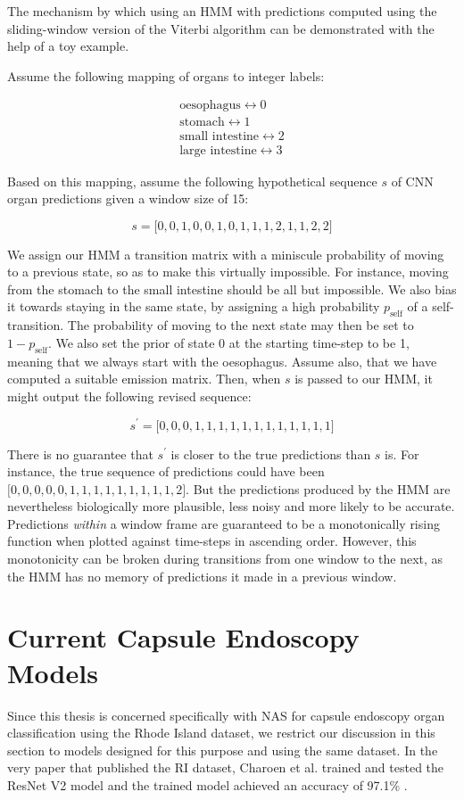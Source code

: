 \documentclass[11pt,a4paper, open=any]{scrbook}
\newcounter{algorithm}[chapter]
\begin{document}
The mechanism by which using an HMM with predictions computed using the sliding-window  version of the Viterbi algorithm can be demonstrated with the help of a toy example.

Assume the following mapping of organs to integer labels:

\begin{align*}
	\text{oesophagus} \leftrightarrow 0\\
	\text{stomach} \leftrightarrow 1\\
	\text{small intestine} \leftrightarrow 2\\
	\text{large intestine} \leftrightarrow 3
\end{align*}

Based on this mapping, assume the following hypothetical sequence $s$ of CNN organ predictions given a window size of 15:


\[
s = \big[0,0,1,0,0,1,0,1,1,1,2,1,1,2,2\big]
\]

We assign our HMM a transition matrix with a miniscule probability of moving to a previous state, so as to make this virtually impossible. For instance, moving from the stomach to the small intestine should be all but impossible. We also bias it towards staying in the same state, by assigning a high probability $p_\text{self}$ of a self-transition. The probability of moving to the next state may then be set to $1-p_\text{self}$. We also set the prior of state 0 at the starting time-step to be 1, meaning that we always start with the oesophagus. Assume also, that we have computed a suitable emission matrix. Then, when $s$ is passed to our HMM, it might output the following revised sequence:

\[
s^\prime = \big[0,0,0,1,1,1,1,1,1,1,1,1,1,1,1\big] 
\]

There is no guarantee that $s^\prime$ is closer to the true predictions than $s$ is. For instance, the true sequence of predictions could have been $\big[0,0,0,0,0,1,1,1,1,1,1,1,1,1,2\big]$. But the predictions produced by the HMM are nevertheless biologically more plausible, less noisy and more likely to be accurate. Predictions \textit{within} a window frame are guaranteed to be a monotonically rising function when plotted against time-steps in ascending order. However, this monotonicity can be broken during transitions from one window to the next, as the HMM has no memory of predictions it made in a previous window.

\section{Current Capsule Endoscopy Models}
Since this thesis is concerned specifically with NAS for capsule endoscopy organ classification using the Rhode Island dataset, we restrict our discussion in this section to models designed for this purpose and using the same dataset. In the very paper that published the RI dataset, Charoen et al. trained and tested the ResNet V2 model and the trained model achieved an accuracy of 97.1\% \cite[4]{ri_dataset}.
\end{document}
